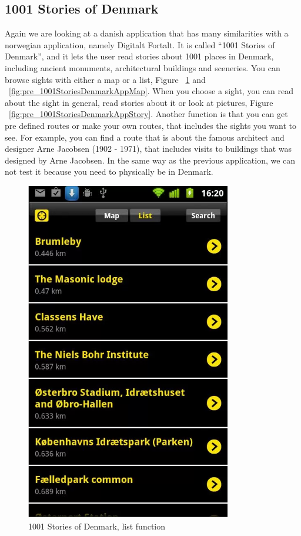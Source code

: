 \documentclass[11pt]{book}
\begin{document}
\subsection{1001 Stories of Denmark}
Again we are looking at a danish application that has many similarities with a norwegian application, namely Digitalt Fortalt. It is called “1001 Stories of Denmark”, and it lets the user read stories about 1001 places in Denmark, including ancient monuments, architectural buildings and sceneries. You can browse sights with either a map or a list, Figure ~\ref{fig:pre_1001StoriesDenmarkAppList} and ~\ref{fig:pre_1001StoriesDenmarkAppMap}. When you choose a sight, you can read about the sight in general, read stories about it or look at pictures, Figure ~\ref{fig:pre_1001StoriesDenmarkAppStory}. Another function is that you can get pre defined routes or make your own routes, that includes the sights you want to see. For example, you can find a route that is about the famous architect and designer Arne Jacobsen (1902 - 1971), that includes visits to buildings that was designed by Arne Jacobsen. In the same way as the previous application, we can not test it because you need to physically be in Denmark.

\begin{figure}[H]
      \centering
      \includegraphics[width=0.8\textwidth]{Figures/Prestudy/1001storiesList.png}
      \caption{1001 Stories of Denmark, list function}
      \label{fig:pre_1001StoriesDenmarkAppList}
\end{figure}
\end{document}

